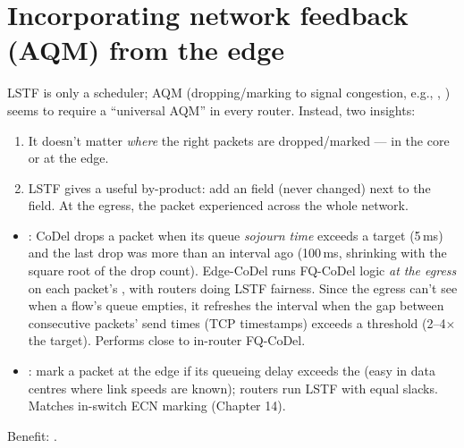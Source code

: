 \section{Incorporating network feedback (AQM) from the edge}
LSTF is only a scheduler; AQM (dropping/marking to signal congestion, e.g., , ) seems to require a ``universal AQM'' in every router. Instead, two insights:
\begin{enumerate}
\item It doesn't matter \emph{where} the right packets are dropped/marked --- in the core or at the edge.
\item LSTF gives a useful by-product: add an  field (never changed) next to the  field. At the egress,  the packet experienced across the whole network.
\end{enumerate}
\begin{itemize}
\item {}: CoDel drops a packet when its queue \emph{sojourn time} exceeds a target (5\,ms) and the last drop was more than an interval ago (100\,ms, shrinking with the square root of the drop count). Edge-CoDel runs FQ-CoDel logic \emph{at the egress} on each packet's , with routers doing LSTF fairness. Since the egress can't see when a flow's queue empties, it refreshes the interval when the gap between consecutive packets' send times (TCP timestamps) exceeds a threshold (2--4$\times$ the target). Performs close to in-router FQ-CoDel.
\item {}: mark a packet at the edge if its queueing delay exceeds the  (easy in data centres where link speeds are known); routers run LSTF with equal slacks. Matches in-switch ECN marking (Chapter 14).
\end{itemize}
Benefit: .

